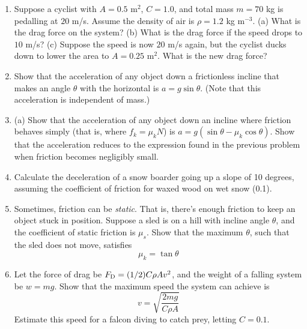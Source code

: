 \documentclass{article}
\begin{document}
\begin{enumerate}
\item Suppose a cyclist with $A = 0.5$ m$^2$, $C = 1.0$, and total mass $m = 70$ kg is pedalling at $20$ m/s.  Assume the density of air is $\rho = 1.2$ kg m$^{-3}$.  (a) What is the drag force on the system? (b) What is the drag force if the speed drops to $10$ m/s? (c)  Suppose the speed is now $20$ m/s again, but the cyclist ducks down to lower the area to $A = 0.25$ m$^2$.  What is the new drag force? \\ \vspace{3cm}
\item Show that the acceleration of any object down a frictionless incline that makes an angle $\theta$ with the horizontal is $a=g\sin\theta$. (Note that this acceleration is independent of mass.) \\ \vspace{3cm}
\item (a) Show that the acceleration of any object down an incline where friction behaves simply (that is, where $f_k = \mu_k N$) is $a = g(\sin\theta - \mu_k\cos\theta)$.  Show that the acceleration reduces to the expression found in the previous problem when friction becomes negligibly small. \\ \vspace{3cm}
\item Calculate the deceleration of a snow boarder going up a slope of 10 degrees, assuming the coefficient of friction for waxed wood on wet snow (0.1). \\ \vspace{3cm}
\item Sometimes, friction can be \textit{static}.  That is, there's enough friction to keep an object stuck in position.  Suppose a sled is on a hill with incline angle $\theta$, and the coefficient of static friction is $\mu_s$.  Show that the maximum $\theta$, such that the sled does not move, satisfies
\begin{equation}
\mu_k = \tan\theta
\end{equation}
\vspace{3cm}
\item Let the force of drag be $F_{\rm D} = (1/2) C \rho A v^2$, and the weight of a falling system be $w=mg$.  Show that the maximum speed the system can achieve is 
\begin{equation}
v = \sqrt{\frac{2mg}{C\rho A}}
\end{equation}
Estimate this speed for a falcon diving to catch prey, letting $C=0.1$.
\end{enumerate}
\end{document}
